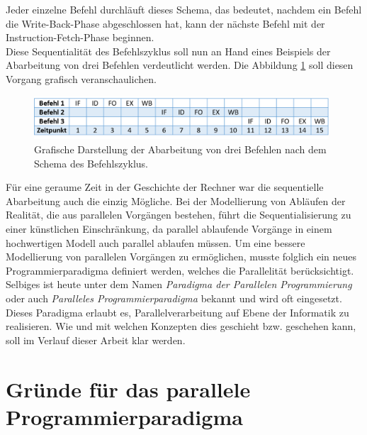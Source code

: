 \begin{description}
						Jeder einzelne Befehl durchläuft dieses Schema, das bedeutet, nachdem ein Befehl die Write-Back-Phase abgeschlossen hat, kann der nächste Befehl mit der Instruction-Fetch-Phase beginnen. \cite{PhasenBefehlsbearbeitung} \cite{FunktionsweiseComputersysteme}\\
						
						Diese Sequentialität des Befehlszyklus soll nun an Hand eines Beispiels der Abarbeitung von drei Befehlen verdeutlicht werden.
						Die Abbildung \ref{fig:BefehlszylusOhnePipelining} soll diesen Vorgang grafisch veranschaulichen.
						
						\begin{figure}
							\centering	
							\includegraphics[width=11cm]{Abbildungen/Befehlszylus_ohne_Pipelining.png}
							\caption{Grafische Darstellung der Abarbeitung von drei Befehlen nach dem Schema des Befehlszyklus.}
							\label{fig:BefehlszylusOhnePipelining}
						\end{figure}
				\end{description}
			
				Für eine geraume Zeit in der Geschichte der Rechner war die sequentielle Abarbeitung auch die einzig Mögliche. Bei der Modellierung von Abläufen der Realität, die aus parallelen Vorgängen bestehen, führt die Sequentialisierung zu einer künstlichen Einschränkung, da parallel ablaufende Vorgänge in einem hochwertigen Modell auch parallel ablaufen müssen.
				Um eine bessere Modellierung von parallelen Vorgängen zu ermöglichen, musste folglich ein neues Programmierparadigma definiert werden, welches die Parallelität berücksichtigt. Selbiges ist heute unter dem Namen \textit{Paradigma der Parallelen Programmierung} oder auch \textit{Paralleles Programmierparadigma} bekannt und wird oft eingesetzt. Dieses Paradigma erlaubt es, Parallelverarbeitung auf Ebene der Informatik zu realisieren. Wie und mit welchen Konzepten dies geschieht bzw. geschehen kann, soll im Verlauf dieser Arbeit klar werden.
				
	\section{Gründe für das parallele Programmierparadigma}
				
